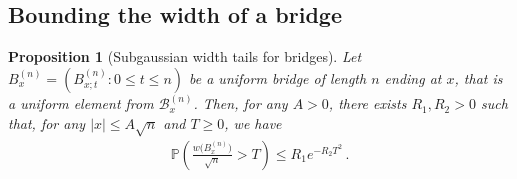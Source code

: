 \documentclass{article}
\newcommand{\pr}{\mathbb{P}}								%
\newcommand{\Prob}[1]{\pr\left(#1\right)}					%
\newcommand{\1}{\mathbbm{1}}								%
\newtheorem{proposition}[theorem]{Proposition}
\theoremstyle{definition}
\numberwithin{equation}{section}
\newcommand{\cB}{\mathcal B}
\begin{document}
\subsection{Bounding the width of a bridge}
\begin{proposition}[Subgaussian width tails for bridges] \label{prop:bridge_subg_tail}
    Let $B^{(n)}_x=(B^{(n)}_{x;t}:0\leq t \leq n)$ be a uniform bridge of length $n$ ending at $x$, that is a uniform element from $\cB^{(n)}_x$.
    Then, for any $A>0$, there exists $R_1,R_2>0$ such that, for any $|x|\leq A\sqrt{n}$ and $T\geq0$, we have
    \begin{align*}
        \Prob{\frac{w\big(B^{(n)}_x\big)}{\sqrt{n}}>T}\leq R_1e^{-R_2T^2}\,.
    \end{align*}
\end{proposition}
\end{document}
